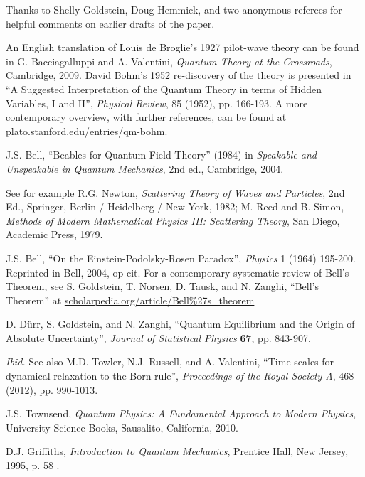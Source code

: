 \documentclass[aps,prc,twocolumn,letterpaper,floatfix]{revtex4}
\begin{document}
\begin{acknowledgments}
Thanks to Shelly Goldstein, Doug Hemmick, and two anonymous referees
for helpful comments on earlier drafts of the paper. 
\end{acknowledgments}


\begin{thebibliography}{99}

  An English translation of Louis de Broglie's 1927
  pilot-wave theory can be found in G. Bacciagalluppi and
  A. Valentini, \emph{Quantum Theory at the Crossroads}, Cambridge,
  2009.  David Bohm's 1952 re-discovery of the theory is presented in
  ``A Suggested Interpretation of the Quantum Theory in terms of
  Hidden Variables, I and II'', \emph{Physical Review}, 85 (1952),
  pp. 166-193.  A more contemporary overview, with further references,
  can be found at \url{plato.stanford.edu/entries/qm-bohm}.

  J.S. Bell, ``Beables for Quantum Field Theory''
  (1984) in \emph{Speakable and Unspeakable in Quantum Mechanics}, 2nd
  ed., Cambridge, 2004. 

 See for example R.G. Newton, \emph{Scattering
    Theory of Waves and Particles}, 2nd Ed., Springer, Berlin /
  Heidelberg / New York, 1982; M. Reed and B. Simon, \emph{Methods of
    Modern Mathematical Physics III: Scattering Theory}, San Diego,
  Academic Press, 1979.

  J.S. Bell, ``On the Einstein-Podolsky-Rosen
  Paradox'', \emph{Physics} 1 (1964) 195-200.  Reprinted in Bell,
  2004, op cit.  For a contemporary systematic review of Bell's
  Theorem, see S. Goldstein, T. Norsen, D. Tausk, and N. Zanghi,
  ``Bell's Theorem'' at \url{scholarpedia.org/article/Bell\%27s_theorem}

 D. D\"urr, S. Goldstein, and N. Zanghi, ``Quantum
  Equilibrium and the Origin of Absolute Uncertainty'', \emph{Journal
    of Statistical Physics} {\bf{67}}, pp. 843-907.

 \emph{Ibid.}  See also M.D. Towler, N.J. Russell, and
  A. Valentini, ``Time scales for dynamical relaxation to the Born
  rule'', \emph{Proceedings of the Royal Society A}, 468 (2012), pp. 990-1013.

 J.S. Townsend, \emph{Quantum Physics:  A
    Fundamental Approach to Modern Physics}, University Science Books,
  Sausalito, California, 2010.

  D.J. Griffiths, \emph{Introduction to Quantum
   Mechanics}, Prentice Hall, New Jersey, 1995, p. 58 .



\end{thebibliography}
\end{document}
